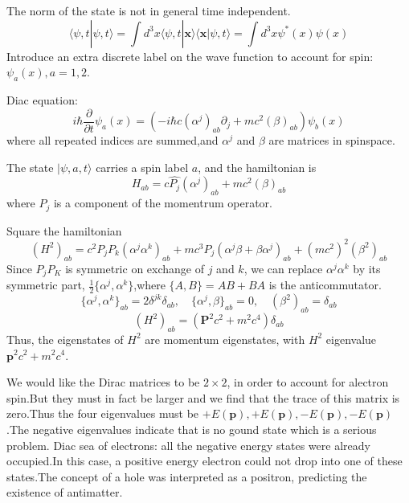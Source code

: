 \documentclass[12pt,a4paper]{article}
\numberwithin{equation}{subsection}
\begin{document}
The norm of the state is not in general time independent.
\begin{equation}
\langle\psi,t|\psi,t\rangle=\int d^3x\langle\psi,t|\mathbf{x}\rangle\langle\mathbf{x}|\psi,t\rangle=\int d^3x\psi^*(x)\psi(x)
\end{equation} 
Introduce an extra discrete label on the wave function to account for spin:$\psi_a(x),a=1,2$.

Diac equation:
\begin{equation}
i\hbar\frac{\partial}{\partial t}\psi_a(x)=\left(-i\hbar c(\alpha^j)_{ab}\partial_j+mc^2(\beta)_{ab}\right)\psi_b(x)
\end{equation}
where all repeated indices are summed,and $\alpha^j$ and $\beta$ are matrices in spinspace.

The state $|\psi,a,t\rangle$ carries a spin label $a$, and the hamiltonian is
\begin{equation}
H_{ab}=c\hat{P_j}(\alpha^j)_{ab}+mc^2(\beta)_{ab}
\end{equation}
where $P_j$ is a component of the momentrum operator.

Square the hamiltonian
\begin{equation}
(H^2)_{ab}=c^2P_jP_k(\alpha^j\alpha^k)_{ab}+mc^3P_j(\alpha^j\beta+\beta\alpha^j)_{ab}+(mc^2)^2(\beta^2)_{ab}
\end{equation}
Since $P_jP_K$ is symmetric on exchange of $j$ and $k$, we can replace $\alpha^j\alpha^k$
by its symmetric part, $\frac{1}{2}\{\alpha^j,\alpha^k\}$,where $\{A,B\}=AB+BA$ is the anticommutator.
\begin{equation}
\{\alpha^j,\alpha^k\}_{ab}=2\delta^{jk}\delta_{ab},\quad\{\alpha^j,\beta\}_{ab}=0,\quad (\beta^2)_{ab}=\delta_{ab}
\end{equation}
\begin{equation}
(H^2)_{ab}=(\mathbf{P}^2c^2+m^2c^4)\delta_{ab}
\end{equation}
Thus, the eigenstates of $H^2$ are momentum eigenstates, with $H^2$ eigenvalue $\mathbf{p}^2c^2 + m^2c^4$.

We would like the Dirac matrices to be $2\times2$, in order to account for alectron spin.But they must in fact be larger and we find that the trace of this matrix is zero.Thus the
four eigenvalues must be $+E(\mathbf{p}),+E(\mathbf{p}),-E(\mathbf{p}),-E(\mathbf{p})$.The negative eigenvalues indicate that is no gound state which is a serious problem.
Diac sea of electrons: all the negative energy states were already occupied.In this case, a positive
energy electron could not drop into one of these states.The concept of a hole was interpreted as a positron, predicting the existence of antimatter.
\end{document}
